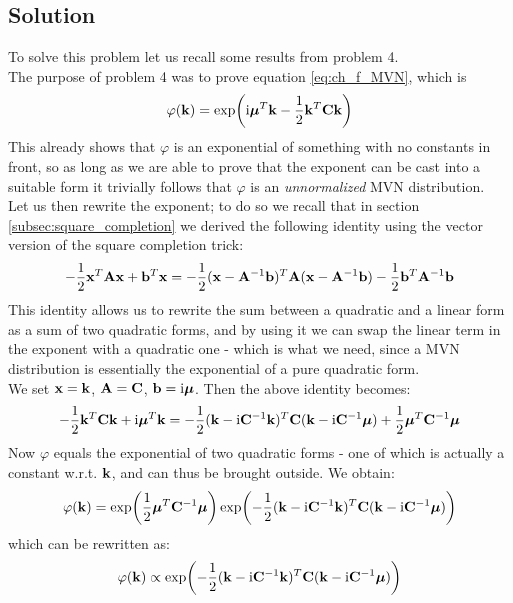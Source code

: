 \documentclass[a4paper]{article}
\newcommand{\mat}[1]{\vb{#1}}
\let\temp\phi%
\let\phi\varphi
\let\varphi\temp
\renewcommand{\i}{\mathrm{i}} %
\begin{document}
\subsection{Solution}
To solve this problem let us recall some results from problem 4.\\
The purpose of problem 4 was to prove equation \eqref{eq:ch_f_MVN}, which is 
\begin{equation*}
    \phi (\vb{k}) = \exp(\i \vb*{\mu}^T \vb{k} - \frac{1}{2}\vb{k}^T \mat{C} \vb{k})
\end{equation*}
This already shows that $\phi$ is an exponential of something with no constants in front, so as long as we are able to prove that the exponent can be cast into a suitable form it trivially follows that $\phi$ is an \emph{unnormalized} MVN distribution.\\
Let us then rewrite the exponent; to do so we recall that in section \ref{subsec:square_completion} we derived the following identity using the vector version of the square completion trick:
\begin{equation*}
    -\frac{1}{2}\vb{x}^T\mat{A}\vb{x} +\vb{b}^T \vb{x} = -\frac{1}{2}(\vb{x} - \mat{A}^{-1}\vb{b})^T \mat{A}(\vb{x} - \mat{A}^{-1}\vb{b}) -\frac{1}{2} \vb{b}^T\mat{A}^{-1}\vb{b}
\end{equation*}
This identity allows us to rewrite the sum between a quadratic and a linear form as a sum of two quadratic forms, and by using it we can swap the linear term in the exponent with a quadratic one - which is what we need, since a MVN distribution is essentially the exponential of a pure quadratic form.\\
We set $\vb{x}=\vb{k}$, $\mat{A} = \mat{C}$, $\vb{b} = \i\vb*{\mu}$. Then the above identity becomes:
\begin{equation*}
    -\frac{1}{2}\vb{k}^T\mat{C}\vb{k} + \i \vb*{\mu}^T \vb{k} = -\frac{1}{2}(\vb{k}-\i \mat{C}^{-1}\vb{k})^T\mat{C}(\vb{k}-\i \mat{C}^{-1}\vb*{\mu}) + \frac{1}{2}\vb*{\mu}^T \mat{C}^{-1}\vb*{\mu}
\end{equation*}
Now $\phi$ equals the exponential of two quadratic forms - one of which is actually a constant w.r.t. $\vb{k}$, and can thus be brought outside. We obtain:
\begin{equation*}
    \phi(\vb{k}) = \exp(\frac{1}{2}\vb*{\mu}^T \mat{C}^{-1} \vb*{\mu}) \exp(-\frac{1}{2}(\vb{k}-\i \mat{C}^{-1}\vb{k})^T\mat{C}(\vb{k}-\i \mat{C}^{-1}\vb*{\mu}))
\end{equation*}
which can be rewritten as:
\begin{equation*}
    \phi(\vb{k})  \propto \exp(-\frac{1}{2}(\vb{k}-\i \mat{C}^{-1}\vb{k})^T\mat{C}(\vb{k}-\i \mat{C}^{-1}\vb*{\mu}))
\end{equation*}
\end{document}
